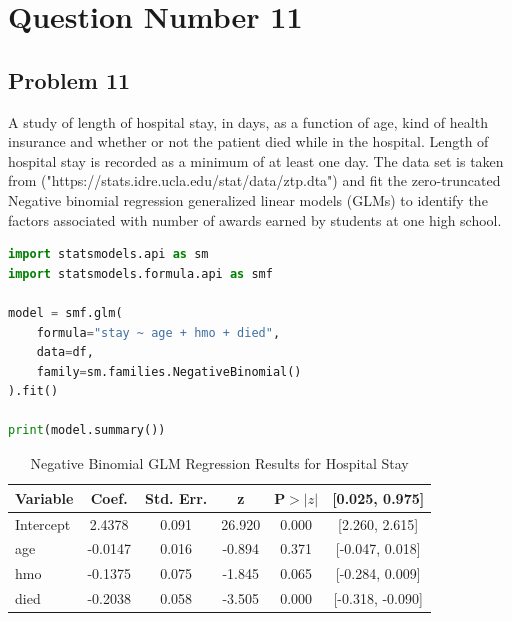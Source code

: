 \documentclass[12pt,a4paper]{report}
\begin{document}
\chapter*{Question Number 11}
\section*{Problem 11}
A study of length of hospital stay, in days, as a function of age, kind of health insurance and whether or not the patient died while in the hospital.
Length of hospital stay is recorded as a minimum of at least one day.
The data set is taken from ("https://stats.idre.ucla.edu/stat/data/ztp.dta") and 
fit the zero-truncated Negative binomial regression generalized linear models (GLMs) to identify the factors associated with number of awards earned by students at one high school. 
\begin{lstlisting}[language=Python, caption=Negative Binomial Regression Model in Python]
import statsmodels.api as sm
import statsmodels.formula.api as smf

model = smf.glm(
    formula="stay ~ age + hmo + died",
    data=df,
    family=sm.families.NegativeBinomial()
).fit()

print(model.summary())
\end{lstlisting}
\begin{table}[h!]
\centering
\begin{tabular}{|l|c|c|c|c|c|}
\hline
\textbf{Variable} & \textbf{Coef.} & \textbf{Std. Err.} & \textbf{z} & \textbf{P$>|z|$} & \textbf{[0.025, 0.975]} \\ \hline
Intercept & 2.4378 & 0.091 & 26.920 & 0.000 & [2.260, 2.615] \\ \hline
age       & -0.0147 & 0.016 & -0.894 & 0.371 & [-0.047, 0.018] \\ \hline
hmo       & -0.1375 & 0.075 & -1.845 & 0.065 & [-0.284, 0.009] \\ \hline
died      & -0.2038 & 0.058 & -3.505 & 0.000 & [-0.318, -0.090] \\ \hline
\end{tabular}
\caption{Negative Binomial GLM Regression Results for Hospital Stay}
\label{tab:nb_glm_stay}
\end{table}
\end{document}

